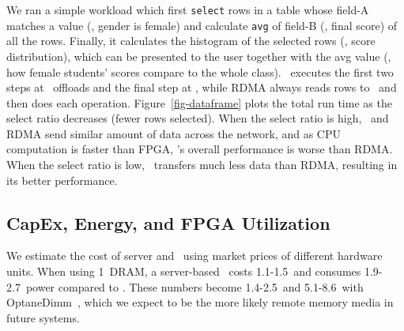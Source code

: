 We ran a simple workload which first \texttt{select} rows in a table whose field-A matches a value (\eg, gender is female)
and calculate \texttt{avg} of field-B (\eg, final score) of all the rows.
Finally, it calculates the histogram of the selected rows (\eg, score distribution), which can be presented to the user together with the avg value (\eg, how female students' scores compare to the whole class).
\sys\ executes the first two steps at \MN\ offloads and the final step at \CN,
while RDMA always reads rows to \CN\ and then does each operation.
Figure~\ref{fig-dataframe} plots the total run time as the select ratio decreases (fewer rows selected).
When the select ratio is high, \sys\ and RDMA send similar amount of data across the network,
and as CPU computation is faster than FPGA, \sys's overall performance is worse than RDMA.
When the select ratio is low, \sys\ transfers much less data than RDMA, resulting in its better performance.
\fi


\subsection{CapEx, Energy, and FPGA Utilization}
\label{sec:results-cost}




We estimate the cost of server and \sysboard\ using market prices of different hardware units. When using 1\TB\ DRAM, a server-based \MN\ costs 1.1-1.5\x\ and consumes 1.9-2.7\x\ power compared to \sysboard. These numbers become 1.4-2.5\x\ and 5.1-8.6\x\ with OptaneDimm~\cite{optane-dcpm}, which we expect to be the more likely remote memory media in future systems.


